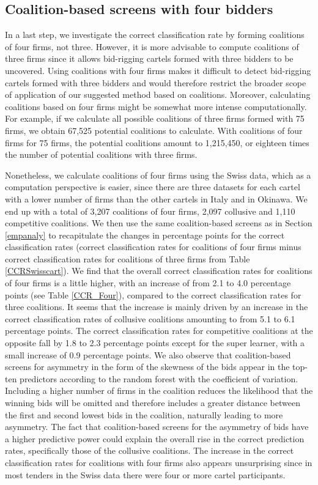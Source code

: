 \documentclass[a4paper,11pt]{article}
\begin{document}
	
	\subsection{Coalition-based screens with four bidders}
	
	In a last step, we investigate the correct classification rate by forming coalitions of four firms, not three. However, it is more advisable to compute coalitions of three firms since it allows bid-rigging cartels formed with three bidders to be uncovered. Using coalitions with four firms makes it difficult to detect bid-rigging cartels formed with three bidders and would therefore restrict the broader scope of application of our suggested method based on coalitions. Moreover, calculating coalitions based on four firms might be somewhat more intense computationally. For example, if we calculate all possible coalitions of three firms formed with 75 firms, we obtain 67,525 potential coalitions to calculate. With coalitions of four firms for 75 firms, the potential coalitions amount to 1,215,450, or eighteen times the number of potential coalitions with three firms.
	
	Nonetheless, we calculate coalitions of four firms using the Swiss data, which as a computation perspective is easier, since there are three datasets for each cartel with a lower number of firms than the other cartels in Italy and in Okinawa. We end up with a total of 3,207 coalitions of four firms, 2,097 collusive and 1,110 competitive coalitions. We then use the same coalition-based screens as in Section \ref{empanaly} to recapitulate the changes in percentage points for the correct classification rates (correct classification rates for coalitions of four firms minus correct classification rates for coalitions of three firms from Table \ref{CCRSwisscart}). We find that the overall correct classification rates for coalitions of four firms is a little higher, with an increase of from 2.1 to 4.0 percentage points (see Table \ref{CCR_Four}), compared to the correct classification rates for three coalitions. It seems that the increase is mainly driven by an increase in the correct classification rates of collusive coalitions amounting to from 5.1 to 6.1 percentage points. The correct classification rates for competitive coalitions at the opposite fall by 1.8 to 2.3 percentage points except for the super learner, with a small increase of 0.9 percentage points. We also observe that coalition-based screens for asymmetry in the form of the skewness of the bids appear in the top-ten predictors according to the random forest with the coefficient of variation. Including a higher number of firms in the coalition reduces the likelihood that the winning bids will be omitted and therefore includes a greater distance between the first and second lowest bids in the coalition, naturally leading to more asymmetry. The fact that coalition-based screens for the asymmetry of bids have a higher predictive power could explain the overall rise in the correct prediction rates, specifically those of the collusive coalitions. The increase in the correct classification rates for coalitions with four firms also appears unsurprising since in most tenders in the Swiss data there were four or more cartel participants. 
	
\end{document}
